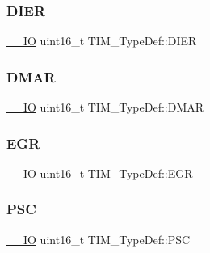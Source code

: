 \subsubsection{\texorpdfstring{DIER}{DIER}}
{\footnotesize\ttfamily \mbox{\hyperlink{group___c_m_s_i_s___c_m3__core__definitions_gaec43007d9998a0a0e01faede4133d6be}{\+\_\+\+\_\+\+IO}} uint16\+\_\+t T\+I\+M\+\_\+\+Type\+Def\+::\+D\+I\+ER}

\mbox{\label{struct_t_i_m___type_def_a4e0fbb52e6dd4bdabcb3f3b2f4bae40c}} 
\subsubsection{\texorpdfstring{DMAR}{DMAR}}
{\footnotesize\ttfamily \mbox{\hyperlink{group___c_m_s_i_s___c_m3__core__definitions_gaec43007d9998a0a0e01faede4133d6be}{\+\_\+\+\_\+\+IO}} uint16\+\_\+t T\+I\+M\+\_\+\+Type\+Def\+::\+D\+M\+AR}

\mbox{\label{struct_t_i_m___type_def_a724fd21b7131fb9ac78c1b661dee3a8d}} 
\subsubsection{\texorpdfstring{EGR}{EGR}}
{\footnotesize\ttfamily \mbox{\hyperlink{group___c_m_s_i_s___c_m3__core__definitions_gaec43007d9998a0a0e01faede4133d6be}{\+\_\+\+\_\+\+IO}} uint16\+\_\+t T\+I\+M\+\_\+\+Type\+Def\+::\+E\+GR}

\mbox{\label{struct_t_i_m___type_def_ad58e05db30d309608402a69d87c36505}} 
\subsubsection{\texorpdfstring{PSC}{PSC}}
{\footnotesize\ttfamily \mbox{\hyperlink{group___c_m_s_i_s___c_m3__core__definitions_gaec43007d9998a0a0e01faede4133d6be}{\+\_\+\+\_\+\+IO}} uint16\+\_\+t T\+I\+M\+\_\+\+Type\+Def\+::\+P\+SC}

\mbox{\label{struct_t_i_m___type_def_aa6957ece6ee709031ab5241d6019fcce}} 
